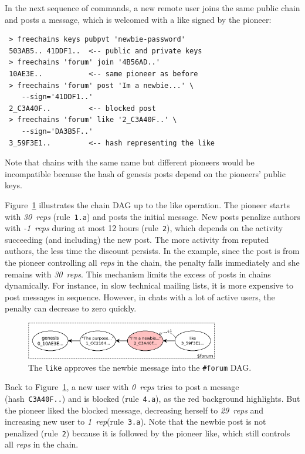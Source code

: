 \documentclass[12pt]{article}
\newcommand{\reps}     {\emph{reps}\xspace}
\newcommand{\onerep}   {\emph{1~rep}\xspace}
\newcommand{\nreps}[1] {\emph{#1~reps\xspace}}
\newcommand{\code}[1]  {\texttt{\footnotesize{#1}}}
\begin{document}
In the next sequence of commands, a new remote user joins the same public chain
and posts a message, which is welcomed with a like signed by the pioneer:

{\footnotesize
\begin{verbatim}
 > freechains keys pubpvt 'newbie-password'
 503AB5.. 41DDF1..  <-- public and private keys
 > freechains 'forum' join '4B56AD..'
 10AE3E..           <-- same pioneer as before
 > freechains 'forum' post 'Im a newbie...' \
    --sign='41DDF1..'
 2_C3A40F..         <-- blocked post
 > freechains 'forum' like '2_C3A40F..' \
    --sign='DA3B5F..'
 3_59F3E1..         <-- hash representing the like
\end{verbatim}
}

Note that chains with the same name but different pioneers would be
incompatible because the hash of genesis posts depend on the pioneers' public
keys.

Figure~\ref{fig.forum} illustrates the chain DAG up to the like operation.
The pioneer starts with \nreps{30} (rule~\code{1.a}) and posts the initial
message.
%
New posts penalize authors with \nreps{-1} during at most 12 hours
(rule~\code{2}), which depends on the activity succeeding (and including) the
new post.
The more activity from reputed authors, the less time the discount persists.
In the example, since the post is from the pioneer controlling all \reps in the
chain, the penalty falls immediately and she remains with \nreps{30}.
This mechanism limits the excess of posts in chains dynamically.
For instance, in slow technical mailing lists, it is more expensive to post
messages in sequence.
However, in chats with a lot of active users, the penalty can decrease to zero
quickly.

\begin{figure}
\centering
\includegraphics[width=0.75\textwidth]{forum.png}
\caption{
    The \code{like} approves the newbie message into the \code{\#forum} DAG.
}
\label{fig.forum}
\end{figure}

Back to Figure~\ref{fig.forum}, a new user with \nreps{0} tries to post a
message (hash~\code{C3A40F..}) and is blocked (rule~\code{4.a}), as the red
background highlights.
But the pioneer liked the blocked message, decreasing herself to \nreps{29}
and increasing new user to \onerep (rule~\code{3.a}).
Note that the newbie post is not penalized (rule~\code{2}) because it is
followed by the pioneer like, which still controls all \reps in the chain.
\end{document}
